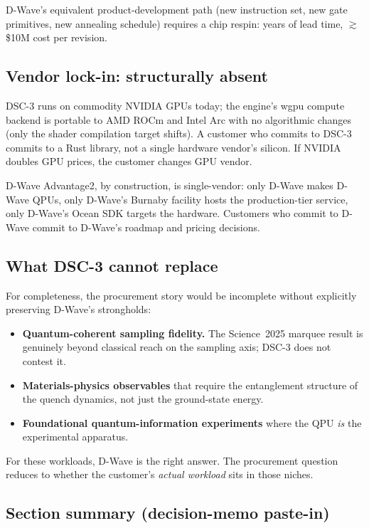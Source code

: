 \documentclass[11pt,a4paper]{article}
\begin{document}
D-Wave's equivalent product-development path (new instruction set,
new gate primitives, new annealing schedule) requires a chip respin:
years of lead time, $\gtrsim$\$10M cost per revision.

\subsection{Vendor lock-in: structurally absent}
\label{sec:vendor_lockin}

DSC-3 runs on commodity NVIDIA GPUs today; the engine's wgpu compute
backend is portable to AMD ROCm and Intel Arc with no algorithmic
changes (only the shader compilation target shifts). A customer who
commits to DSC-3 commits to a Rust library, not a single hardware
vendor's silicon. If NVIDIA doubles GPU prices, the customer changes
GPU vendor.

D-Wave Advantage2, by construction, is single-vendor: only D-Wave
makes D-Wave QPUs, only D-Wave's Burnaby facility hosts the
production-tier service, only D-Wave's Ocean SDK targets the
hardware. Customers who commit to D-Wave commit to D-Wave's
roadmap and pricing decisions.

\subsection{What DSC-3 cannot replace}
\label{sec:cannot_replace}

For completeness, the procurement story would be incomplete without
explicitly preserving D-Wave's strongholds:

\begin{itemize}\itemsep0.1em
\item[$\bullet$] \textbf{Quantum-coherent sampling fidelity.} The
  Science~2025 marquee result is genuinely beyond classical reach
  on the sampling axis; DSC-3 does not contest it.
\item[$\bullet$] \textbf{Materials-physics observables} that require
  the entanglement structure of the quench dynamics, not just the
  ground-state energy.
\item[$\bullet$] \textbf{Foundational quantum-information experiments}
  where the QPU \emph{is} the experimental apparatus.
\end{itemize}

For these workloads, D-Wave is the right answer. The procurement
question reduces to whether the customer's \emph{actual workload}
sits in those niches.

\subsection*{Section summary (decision-memo paste-in)}
\end{document}

